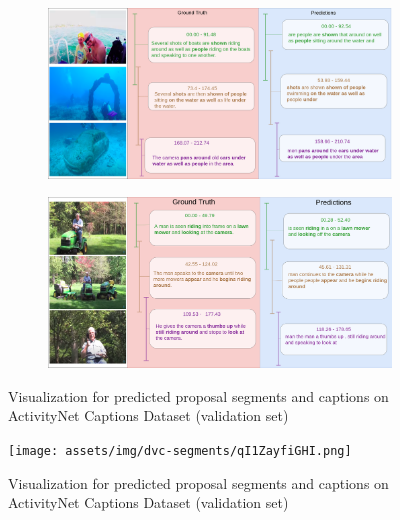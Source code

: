 \begin{figure}[h]	
    \begin{subfigure}[b]{\linewidth}
	\includegraphics[width=\linewidth] {assets/img/dvc-segments/FsS_NCZEfaI.png}
    \end{subfigure}%
	\vspace{4mm}
    \begin{subfigure}[b]{\linewidth}
        \includegraphics[width=\linewidth] {assets/img/dvc-segments/puK4NxGKNdQ.png}
    \end{subfigure}
    \caption{Visualization for predicted proposal segments and captions on ActivityNet Captions Dataset (validation set)}

	\label{fig:dvc-segments-1}
\end{figure}

\begin{figure}
	\centering
	\texttt{[image: assets/img/dvc-segments/qI1ZayfiGHI.png]}
	\caption{Visualization for predicted proposal segments and captions on ActivityNet Captions Dataset (validation set)}
	\label{fig:dvc-segments-2}
\end{figure}


